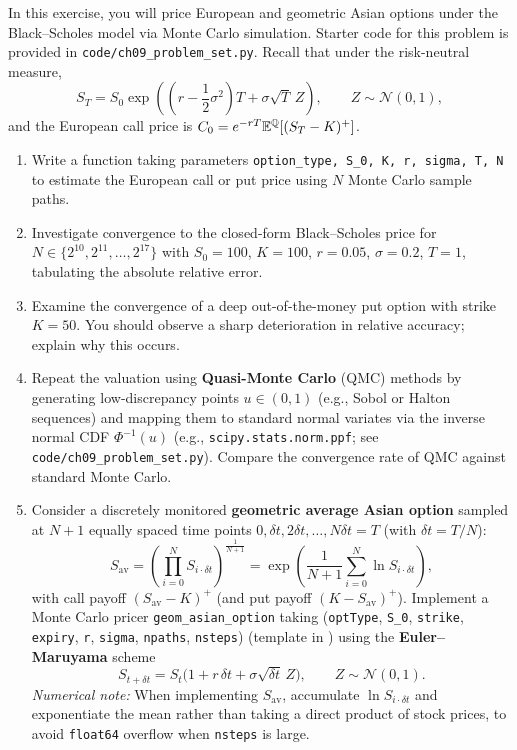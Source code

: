 \begin{problem}
    In this exercise, you will price European and geometric Asian options under the Black--Scholes model via Monte Carlo simulation. Starter code for this problem is provided in \texttt{code/ch09\_problem\_set.py}. Recall that under the risk-neutral measure,
    \[
    S_T = S_0 \exp\!\left(\left(r - \frac{1}{2}\sigma^2\right)T + \sigma\sqrt{T}\,Z\right), \qquad Z \sim \mathcal{N}(0, 1),
    \]
    and the European call price is $C_0 = e^{-rT}\mathbb{E}^{\mathbb{Q}}[(S_T - K)^{+}]$.
    \begin{enumerate}
        \item Write a function taking parameters \texttt{option\_type, S\_0, K, r, sigma, T, N} to estimate the European call or put price using $N$ Monte Carlo sample paths.
        \item Investigate convergence to the closed-form Black--Scholes price for $N \in \{2^{10}, 2^{11}, \ldots, 2^{17}\}$ with $S_0 = 100$, $K = 100$, $r = 0.05$, $\sigma = 0.2$, $T = 1$, tabulating the absolute relative error.
        \item Examine the convergence of a deep out-of-the-money put option with strike $K = 50$. You should observe a sharp deterioration in relative accuracy; explain why this occurs.
        \item Repeat the valuation using \textbf{Quasi-Monte Carlo} (QMC) methods by generating low-discrepancy points $u \in (0, 1)$ (e.g., Sobol or Halton sequences) and mapping them to standard normal variates via the inverse normal CDF $\Phi^{-1}(u)$ (e.g., \texttt{scipy.stats.norm.ppf}; see \texttt{code/ch09\_problem\_set.py}). Compare the convergence rate of QMC against standard Monte Carlo.
        \item Consider a discretely monitored \textbf{geometric average Asian option} sampled at $N + 1$ equally spaced time points $0, \delta t, 2\delta t, \ldots, N\delta t = T$ (with $\delta t = T/N$):
        \[
        S_{\text{av}} = \left(\prod_{i=0}^N S_{i\cdot\delta t}\right)^{\frac{1}{N+1}} = \exp\!\left(\frac{1}{N+1}\sum_{i=0}^N \ln S_{i\cdot\delta t}\right),
        \]
        with call payoff $(S_{\text{av}} - K)^{+}$ (and put payoff $(K - S_{\text{av}})^{+}$). Implement a Monte Carlo pricer \texttt{geom\_asian\_option} taking (\texttt{optType}, \texttt{S\_0}, \texttt{strike}, \texttt{expiry}, \texttt{r}, \texttt{sigma}, \texttt{npaths}, \texttt{nsteps}) (template in ) using the \textbf{Euler--Maruyama} scheme
        \[
        S_{t + \delta t} = S_t\bigl(1 + r\,\delta t + \sigma\sqrt{\delta t}\,Z\bigr), \qquad Z \sim \mathcal{N}(0, 1).
        \]
        \emph{Numerical note:} When implementing $S_{\text{av}}$, accumulate $\ln S_{i\cdot\delta t}$ and exponentiate the mean rather than taking a direct product of stock prices, to avoid \texttt{float64} overflow when \texttt{nsteps} is large.
    \end{enumerate}
\end{problem}


